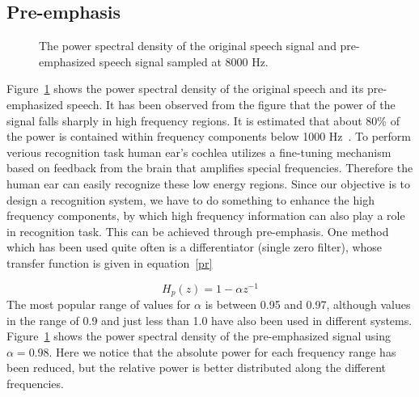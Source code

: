 \begin{spacing}{1.5}
\subsection{Pre-emphasis}
\begin{figure}[h]
\caption{The power spectral density of the original speech signal and pre-emphasized speech signal sampled at 8000 Hz.}
\label{pemp}
\end{figure} 
Figure~\ref{pemp} shows the power spectral density of the original speech and its pre-emphasized speech. It has been observed from the figure that the power of the signal falls sharply in high frequency regions. It is estimated that about 80\% of the power is contained within frequency components below 1000 Hz~\cite{beigi2011speaker}. To perform verious recognition task human ear's cochlea utilizes a fine-tuning mechanism based on feedback from the brain that amplifies special frequencies. Therefore the human ear can easily recognize these low energy regions. Since our objective is to design a recognition system, we have to do something to enhance the high frequency components, by which high frequency information can also play a role in recognition task. This can be achieved through pre-emphasis. One method which has been used quite often is a differentiator (single zero filter), whose transfer function is given in equation~\ref{pr}  


\begin{equation}
\label{pr}
    H_{p}(z)=1-\alpha z^{-1}
\end{equation}
The most popular range of values for $ \alpha $ is between 0.95 and 0.97, although values in the range of 0.9 and just less than 1.0 have also been used in different systems.
Figure~\ref{pemp} shows the power spectral density of the pre-emphasized signal using $ \alpha=0.98 $. Here we notice that the absolute power for each frequency range has been reduced, but the relative power is better distributed along the different frequencies.


\end{spacing}
